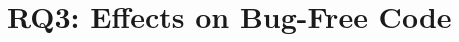 \documentclass[acmsmall]{acmart}
\begin{document}



\section{RQ3: Effects on Bug-Free Code}
\end{document}
